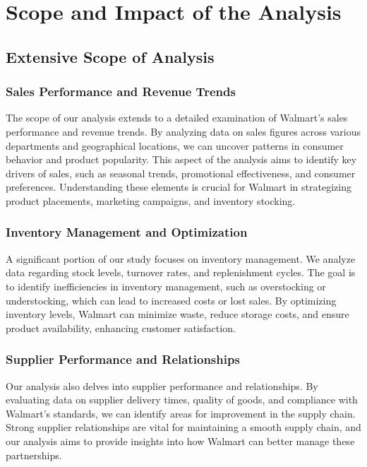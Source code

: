 \documentclass[conference]{IEEEtran}
\begin{document}
\section{Scope and Impact of the Analysis}

\subsection{Extensive Scope of Analysis}

\subsubsection{Sales Performance and Revenue Trends}
The scope of our analysis extends to a detailed examination of Walmart's sales performance and revenue trends. By analyzing data on sales figures across various departments and geographical locations, we can uncover patterns in consumer behavior and product popularity. This aspect of the analysis aims to identify key drivers of sales, such as seasonal trends, promotional effectiveness, and consumer preferences. Understanding these elements is crucial for Walmart in strategizing product placements, marketing campaigns, and inventory stocking.

\subsubsection{Inventory Management and Optimization}
A significant portion of our study focuses on inventory management. We analyze data regarding stock levels, turnover rates, and replenishment cycles. The goal is to identify inefficiencies in inventory management, such as overstocking or understocking, which can lead to increased costs or lost sales. By optimizing inventory levels, Walmart can minimize waste, reduce storage costs, and ensure product availability, enhancing customer satisfaction.

\subsubsection{Supplier Performance and Relationships}
Our analysis also delves into supplier performance and relationships. By evaluating data on supplier delivery times, quality of goods, and compliance with Walmart’s standards, we can identify areas for improvement in the supply chain. Strong supplier relationships are vital for maintaining a smooth supply chain, and our analysis aims to provide insights into how Walmart can better manage these partnerships.
\end{document}
